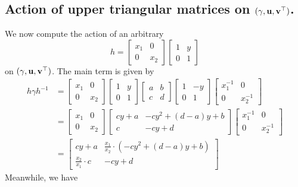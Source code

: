 \subsection{Action of upper triangular matrices on $(\gamma, \mathbf u, \mathbf v^\top)$.}
We now compute the action of an arbitrary
\[ h = \begin{bmatrix} x_1 & 0 \\ 0 & x_2 \end{bmatrix}
  \begin{bmatrix} 1 & y \\ 0 & 1 \end{bmatrix} \]
on $(\gamma, \mathbf u, \mathbf v^\top)$.
The main term is given by
\begin{align*}
  h \gamma h^{-1}
  &=
  \begin{bmatrix} x_1 & 0 \\ 0 & x_2 \end{bmatrix}
  \begin{bmatrix} 1 & y \\ 0 & 1 \end{bmatrix}
  \begin{bmatrix} a & b \\ c & d \end{bmatrix}
  \begin{bmatrix} 1 & -y \\ 0 & 1 \end{bmatrix}
  \begin{bmatrix} x_1^{-1} & 0 \\ 0 & x_2^{-1} \end{bmatrix} \\
  &=
  \begin{bmatrix} x_1 & 0 \\ 0 & x_2 \end{bmatrix}
  \begin{bmatrix} cy + a & -cy^2+(d-a)y+b \\ c & -cy+d \end{bmatrix}
  \begin{bmatrix} x_1^{-1} & 0 \\ 0 & x_2^{-1} \end{bmatrix} \\
  &=
  \begin{bmatrix} cy + a & \frac{x_1}{x_2} \cdot \left( -cy^2+(d-a)y+b \right) \\
    \frac{x_2}{x_1} \cdot c & -cy+d \end{bmatrix}
\end{align*}
Meanwhile, we have
